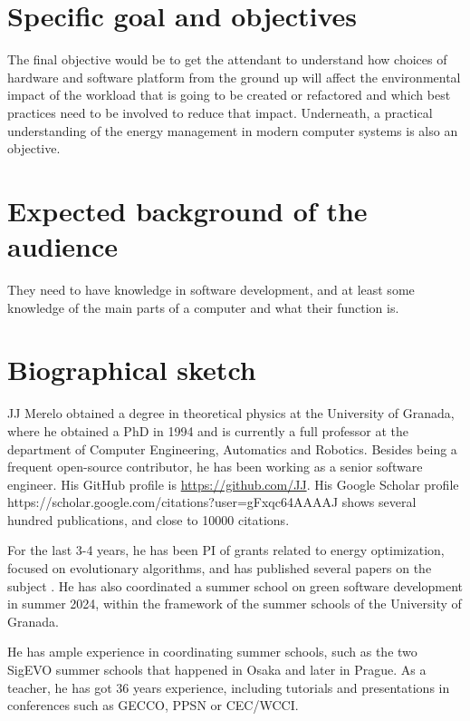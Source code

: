 \documentclass[a4paper]{article}
\begin{document}
\section{Specific goal and objectives}

The final objective would be to get the attendant to understand how choices of
hardware and software platform from the ground up will affect the environmental
impact of the workload that is going to be created or refactored and which best
practices need to be involved to reduce that impact. Underneath, a practical
understanding of the energy management in modern computer systems is also an
objective.

\section{Expected background of the audience}

They need to have knowledge in software development, and at least some knowledge
of the main parts of a computer and what their function is.

\section{Biographical sketch}

JJ Merelo obtained a degree in theoretical physics at the University of Granada,
where he obtained a PhD in 1994 and is currently a full professor at the
department of Computer Engineering, Automatics and Robotics. Besides being a
frequent open-source contributor, he has been working as a senior software
engineer. His GitHub profile is \url{https://github.com/JJ}. His Google Scholar
profile https://scholar.google.com/citations?user=gFxqc64AAAAJ shows several
hundred publications, and close to 10000 citations.

For the last 3-4 years, he has been PI of grants related to energy optimization,
focused on evolutionary algorithms, and has published several papers on the
subject \cite{DBLP:conf/icsoft/GuervosGC23}. He has also coordinated a summer
school on green software development in summer 2024, within the framework of the
summer schools of the University of Granada.

He has ample experience in coordinating summer schools, such as the two
SigEVO summer schools that happened in Osaka and later in Prague. As a teacher,
he has got 36 years experience, including tutorials and presentations in
conferences such as GECCO, PPSN or CEC/WCCI.
\end{document}
